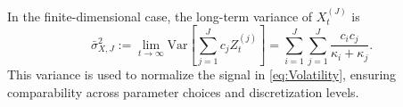 In the finite-dimensional case, the long-term variance of $X_t^{(J)}$ is
\begin{equation}
    \bar{\sigma}_{X,J}^2 := \lim_{t \to \infty} \mathrm{Var} \left[ \sum_{j=1}^J c_j Z_t^{(j)} \right] = \sum_{i=1}^J \sum_{j=1}^J \frac{c_i c_j}{\kappa_i + \kappa_j}.
\end{equation}
This variance is used to normalize the signal in \eqref{eq:Volatility}, ensuring comparability across parameter choices and discretization levels.